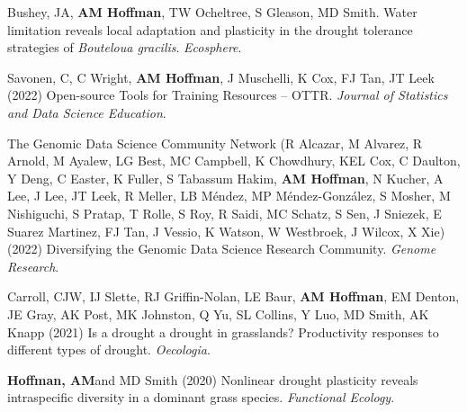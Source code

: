 \documentclass{cv}
\begin{document}
\begin{pubenum}




\item Bushey, JA, \textbf{AM Hoffman}, TW Ocheltree, S Gleason, MD Smith. Water limitation reveals local adaptation and plasticity in the drought tolerance strategies of \textit{Bouteloua gracilis}. \textit{Ecosphere}. 

\item Savonen, C, C Wright, \textbf{AM Hoffman}, J Muschelli, K Cox, FJ Tan, JT Leek (2022) Open-source Tools for Training Resources -- OTTR. \textit{Journal of Statistics and Data Science Education}. 

\item The Genomic Data Science Community Network (R Alcazar, M Alvarez, R Arnold, M Ayalew, LG Best, MC Campbell, K Chowdhury, KEL Cox, C Daulton, Y Deng, C Easter, K Fuller, S Tabassum Hakim, \textbf{AM Hoffman}\footnotemark[1], N Kucher, A Lee, J Lee, JT Leek, R Meller, LB Méndez, MP Méndez-González, S Mosher, M Nishiguchi, S Pratap, T Rolle, S Roy, R Saidi, MC Schatz, S Sen, J Sniezek, E Suarez Martinez, FJ Tan, J Vessio, K Watson, W Westbroek, J Wilcox, X Xie) (2022) Diversifying the Genomic Data Science Research Community. \textit{Genome Research}. 

\item Carroll, CJW, IJ Slette, RJ Griffin-Nolan, LE Baur, \textbf{AM Hoffman}, EM Denton, JE Gray, AK Post, MK Johnston, Q Yu, SL Collins, Y Luo, MD Smith, AK Knapp (2021) Is a drought a drought in grasslands? Productivity responses to different types of drought. \textit{Oecologia}. 

\item\textbf{Hoffman, AM}\footnotemark[1] and MD Smith (2020) Nonlinear drought plasticity reveals intraspecific diversity in a dominant grass species. \textit{Functional Ecology}. \footnotemark[\value{footnote}]


\end{pubenum}
\end{document}
